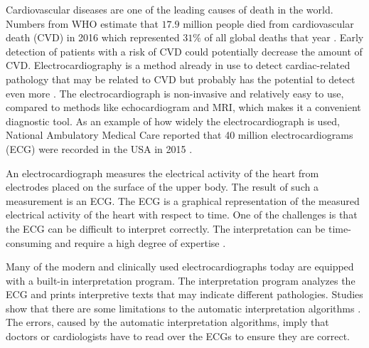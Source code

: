 Cardiovascular diseases are one of the leading causes of death in the world. Numbers from WHO estimate that $17.9$ million people died from cardiovascular death (CVD) in 2016 which represented $31\%$ of all global deaths that year \cite{noauthor_cardiovascular_nodate}. Early detection of patients with a risk of CVD could potentially decrease the amount of CVD. Electrocardiography is a method already in use to detect cardiac-related pathology that may be related to CVD but probably has the potential to detect even more \cite{schlapfer_computer-interpreted_2017}. The electrocardiograph is non-invasive and relatively easy to use, compared to methods like echocardiogram and MRI, which makes it a convenient diagnostic tool. As an example of how widely the electrocardiograph is used, National Ambulatory Medical Care reported that 40 million electrocardiograms (ECG) were recorded in the USA in 2015 \cite{us_department_of_health_and_human_services_national_2015}.

An electrocardiograph measures the electrical activity of the heart from electrodes placed on the surface of the upper body. The result of such a measurement is an ECG. The ECG is a graphical representation of the measured electrical activity of the heart with respect to time. One of the challenges is that the ECG can be difficult to interpret correctly. The interpretation can be time-consuming and require a high degree of expertise \cite{bickerton_misplaced_2019}.

Many of the modern and clinically used electrocardiographs today are equipped with a built-in interpretation program. The interpretation program analyzes the ECG and prints interpretive texts that may indicate different pathologies. Studies show that there are some limitations to the automatic interpretation algorithms \cite{schlapfer_computer-interpreted_2017, smulyan_computerized_2019}. The errors, caused by the automatic interpretation algorithms, imply  that doctors or cardiologists have to read over the ECGs to ensure they are correct.



